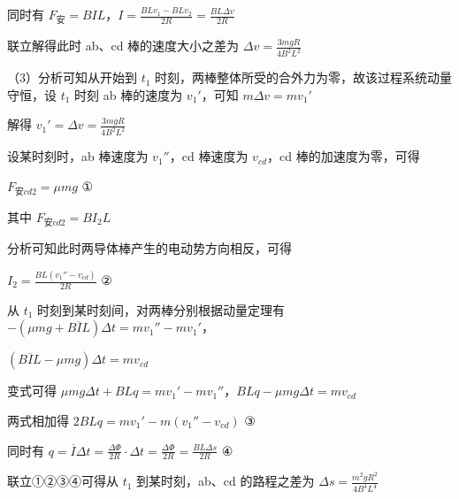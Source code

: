 \documentclass[\gkver]{gaokaozhenti}
\begin{document}
\begin{enumerate}
{	同时有 $F_{\text{安}} = BIL$，$I = \frac{BLv_{1} - BLv_{2}}{2R} = \frac{BL\Delta v}{2R}$

	联立解得此时 ab、cd 棒的速度大小之差为 $\Delta v = \frac{3mgR}{4B^{2}L^{2}}$

	（3）分析可知从开始到 $t_{1}$ 时刻，两棒整体所受的合外力为零，故该过程系统动量守恒，设 $t_{1}$ 时刻 ab 棒的速度为 $v_{1}'$，可知 $m\Delta v = mv_{1}'$

	解得 $v_{1}' = \Delta v = \frac{3mgR}{4B^{2}L^{2}}$

	设某时刻时，ab 棒速度为 $v_{1}''$，cd 棒速度为 $v_{cd}$，cd 棒的加速度为零，可得

	$F_{\text{安}cd2} = \mu mg$ ①

	其中 $F_{\text{安}cd2} = BI_{2}L$

	分析可知此时两导体棒产生的电动势方向相反，可得

	$I_{2} = \frac{BL(v_{1}'' - v_{cd})}{2R}$ ②

	从 $t_{1}$ 时刻到某时刻间，对两棒分别根据动量定理有 $-\left(\mu mg + B\overline{I}L\right)\Delta t = mv_{1}'' - mv_{1}'$，

	$\left(B\overline{I}L - \mu mg\right)\Delta t = mv_{cd}$

	变式可得 $\mu mg\Delta t + BLq = mv_{1}' - mv_{1}''$，$BLq - \mu mg\Delta t = mv_{cd}$

	两式相加得 $2BLq = mv_{1}' - m\left(v_{1}'' - v_{cd}\right)$ ③

	同时有 $q = \overline{I}\Delta t = \frac{\Delta\Phi}{2R}\cdot\Delta t = \frac{\Delta\Phi}{2R} = \frac{BL\Delta s}{2R}$ ④

	联立①②③④可得从 $t_{1}$ 到某时刻，ab、cd 的路程之差为 $\Delta s = \frac{m^{2}gR^{2}}{4B^{4}L^{4}}$
}

\end{enumerate}
\end{document}
